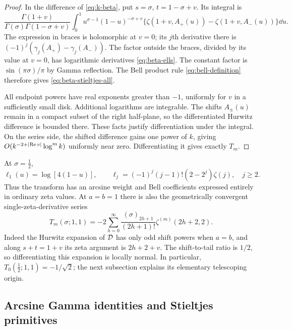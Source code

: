 \begin{proof}
In the difference of \eqref{eq:k-beta}, put
$s=\sigma$, $t=1-\sigma+v$. Its integral is
\[
 \frac{\Gamma(1+v)}{\Gamma(\sigma)\Gamma(1-\sigma+v)}
 \int_0^1 u^{\sigma-1}(1-u)^{-\sigma+v}
 \{\zeta(1+v,A_+(u))-\zeta(1+v,A_-(u))\}\dd u.
\]
The expression in braces is holomorphic at $v=0$; its $j$th
derivative there is $(-1)^j(\gamma_j(A_+)-\gamma_j(A_-))$.
The factor outside the braces, divided by its value at $v=0$,
has logarithmic derivatives \eqref{eq:beta-ells}. The constant
factor is $\sin(\pi\sigma)/\pi$ by Gamma reflection.
The Bell product rule \eqref{eq:bell-definition} therefore gives
\eqref{eq:beta-stieltjes-all}.

All endpoint powers have real exponents greater than $-1$, uniformly
for $v$ in a sufficiently small disk. Additional logarithms are
integrable. The shifts $A_\pm(u)$ remain in a compact subset of the
right half-plane, so the differentiated Hurwitz difference is
bounded there. These facts justify differentiation under the
integral. On the series side, the shifted difference gains one
power of $k$, giving $O(k^{-2+\lvert\operatorname{Re} v\rvert}\log^m k)$
uniformly near zero. Differentiating it gives exactly $T_m$.
\end{proof}

At $\sigma=\tfrac12$,
\begin{equation}\label{eq:half-beta-ells}
 \ell_1(u)=\log[4(1-u)],\qquad
 \ell_j=(-1)^j(j-1)!(2-2^j)\zeta(j),\quad j\ge2.
\end{equation}
Thus the transform has an arcsine weight and Bell coefficients
expressed entirely in ordinary zeta values. At $a=b=1$ there is
also the geometrically convergent single-zeta-derivative series
\begin{equation}\label{eq:beta-jet-zeta}
 T_m(\sigma;1,1)
 =-2\sum_{h=0}^{\infty}\frac{(\sigma)_{2h+1}}{(2h+1)!}
       \zeta^{(m)}(2h+2,2).
\end{equation}
Indeed the Hurwitz expansion of $\mathcal D$ has only odd shift powers
when $a=b$, and along $s+t=1+v$ its zeta argument is $2h+2+v$.
The shift-to-tail ratio is $1/2$, so differentiating this expansion
is locally normal. In particular,
$T_0(\tfrac12;1,1)=-1/\sqrt2$; the next subsection explains its
elementary telescoping origin.

\subsection{Arcsine Gamma identities and Stieltjes primitives}

